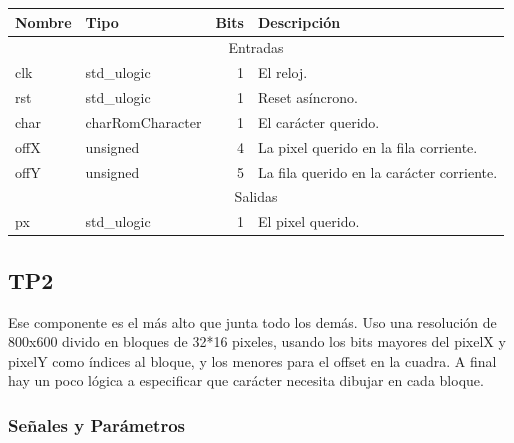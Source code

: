 \documentclass[a4paper]{article}
\begin{document}
\begin{tabular}{| l | l | r | p{8cm} |}
\hline
\textbf{Nombre} & \textbf{Tipo} & \textbf{Bits} & \textbf{Descripción} \\ \hline
\multicolumn{4}{|c|}{Entradas} \\ \hline
clk & std\_ulogic & 1 & El reloj. \\ 
rst & std\_ulogic & 1 & Reset asíncrono. \\
char & charRomCharacter & 1 & El carácter querido. \\
offX & unsigned & 4 & La pixel querido en la fila corriente. \\
offY & unsigned & 5 & La fila querido en la carácter corriente. \\
\hline
\multicolumn{4}{|c|}{Salidas} \\ \hline
px & std\_ulogic & 1 & El pixel querido. \\
\hline
\end{tabular}

\subsection{TP2}

Ese componente es el más alto que junta todo los demás. Uso una resolución de 800x600 divido en bloques de 32*16 pixeles, usando los bits mayores del pixelX y pixelY como índices al bloque, y los menores para el offset en la cuadra. A final hay un poco lógica a especificar que carácter necesita dibujar en cada bloque.

\subsubsection{Señales y Parámetros}
\end{document}
